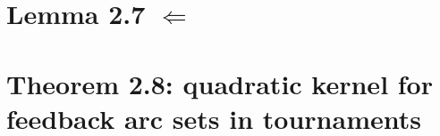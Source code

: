 \documentclass{beamer}
\begin{document}
	
	\section{Lemma 2.7 \(\Leftarrow\)}
	
	\section{Theorem 2.8: quadratic kernel for feedback arc sets in tournaments}
	
\end{document}
